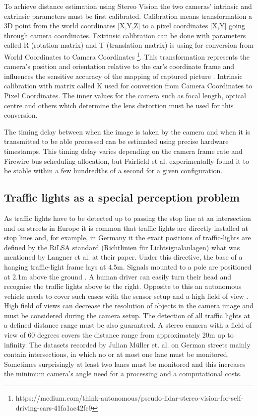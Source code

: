 \documentclass[letterpaper, 10 pt, conference]{ieeeconf} %
\begin{document}
To achieve distance estimation using Stereo Vision the two cameras' intrinsic and extrinsic parameters must be first calibrated. Calibration means transformation a 3D point from the world coordinates [X,Y,Z] to a pixel coordinates [X,Y] going through camera coordinates. Extrinsic calibration can be done with parameters called R (rotation matrix) and T (translation matrix) is using for conversion from World Coordinates to Camera Coordinates \footnote{https://medium.com/think-autonomous/pseudo-lidar-stereo-vision-for-self-driving-cars-41fa1ac42fc9}. This transformation represents the camera’s position and orientation relative to the car’s coordinate frame and influences the sensitive accuracy of the mapping of captured picture \cite{c4}. Intrinsic calibration with matrix called K used for conversion from Camera Coordinates to Pixel Coordinates. The inner values for the camera such as focal length, optical centre and others which determine the lens distortion must be used for this conversion. 

The timing delay between when the image is taken by the camera and when it is transmitted to be able processed can be estimated using precise hardware timestamps. This timing delay varies depending on the camera frame rate and Firewire bus scheduling allocation, but Fairfield et al. experimentally found it to be stable within a few hundredths of a second for a given configuration.
 
\subsection{Traffic lights as a special perception problem}

As traffic lights have to be detected up to passing the stop line at an intersection and on streets in Europe it is common that traffic lights are directly installed at stop lines \cite{c2} and, for example, in Germany it the exact positions of traffic-lights are defined by the RiLSA standard (Richtlinien f\"ur Lichtsignalanlagen) \cite{c4} what was mentioned by Langner et al. at their paper. Under this directive, the base of a hanging traffic-light frame lays at 4.5m. Signals mounted to a pole are positioned at 2.1m above the ground \cite{c4}. A human driver can easily turn their head and recognise the traffic lights above to the right. Opposite to this an autonomous vehicle needs to cover such cases with the sensor setup and a high field of view \cite{c2}. High field of views can decrease the resolution of objects in the camera image and must be considered during the camera setup. The detection of all traffic lights at a defined distance range must be also guaranteed. A stereo camera with a field of view of 60 degrees covers the distance range from approximately 20m up to infinity. The datasets recorded by Julian M\"uller et. al. \cite{c1} \cite{c2} on German streets mainly contain intersections, in which no or at most one lane must be monitored. Sometimes surprisingly at least two lanes must be monitored and this increases the minimum camera's angle need for a processing and a computational costs.
\end{document}
